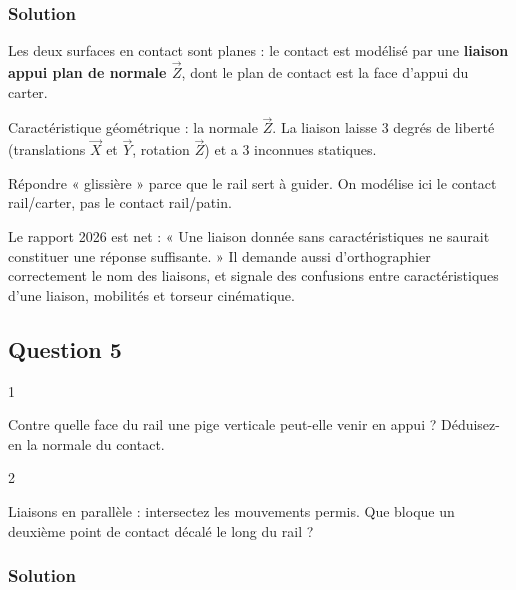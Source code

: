 \documentclass[11pt,a4paper]{article}
\begin{document}
\hypertarget{solution-3}{%
\subsubsection{Solution}\label{solution-3}}

Les deux surfaces en contact sont planes : le contact est modélisé par une \textbf{liaison appui plan de normale \(\vec Z\)}, dont le plan de contact est la face d'appui du carter.

Caractéristique géométrique : la normale \(\vec Z\). La liaison laisse 3 degrés de liberté (translations \(\vec X\) et \(\vec Y\), rotation \(\vec Z\)) et a 3 inconnues statiques.

\begin{piege}

Répondre « glissière » parce que le rail sert à guider. On modélise ici le contact rail/carter, pas le contact rail/patin.

\end{piege}

\begin{jury}

Le rapport 2026 est net : « Une liaison donnée sans caractéristiques ne saurait constituer une réponse suffisante. » Il demande aussi d'orthographier correctement le nom des liaisons, et signale des confusions entre caractéristiques d'une liaison, mobilités et torseur cinématique.

\end{jury}

\hypertarget{question-5}{%
\subsection{Question 5}\label{question-5}}

\begin{indication}{1}

Contre quelle face du rail une pige verticale peut-elle venir en appui ? Déduisez-en la normale du contact.

\end{indication}

\begin{indication}{2}

Liaisons en parallèle : intersectez les mouvements permis. Que bloque un deuxième point de contact décalé le long du rail ?

\end{indication}

\hypertarget{solution-4}{%
\subsubsection{Solution}\label{solution-4}}
\end{document}
